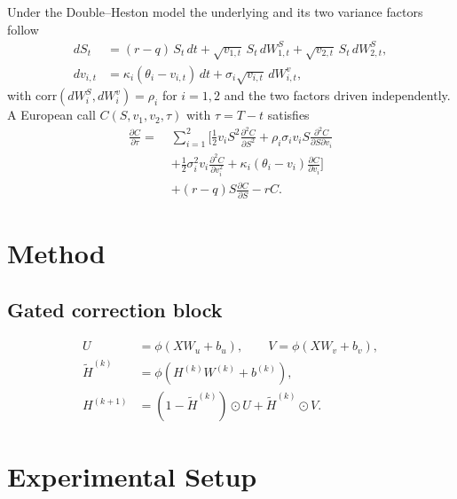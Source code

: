 \documentclass[conference]{IEEEtran}
\begin{document}
Under the Double--Heston model the underlying and its two variance factors
follow
\begin{align}
dS_t &= (r-q)\,S_t\,dt + \sqrt{v_{1,t}}\,S_t\,dW^S_{1,t} + \sqrt{v_{2,t}}\,S_t\,dW^S_{2,t},\\
dv_{i,t} &= \kappa_i(\theta_i - v_{i,t})\,dt + \sigma_i\sqrt{v_{i,t}}\,dW^{v}_{i,t},
\end{align}
with $\mathrm{corr}(dW^S_{i},dW^{v}_{i}) = \rho_i$ for $i=1,2$ and the two
factors driven independently. A European call $C(S,v_1,v_2,\tau)$ with
$\tau = T-t$ satisfies
\begin{equation}
\begin{aligned}
\frac{\partial C}{\partial \tau} =\;&
\sum_{i=1}^{2}\Big[\tfrac{1}{2} v_i S^2 \frac{\partial^2 C}{\partial S^2}
+ \rho_i \sigma_i v_i S \frac{\partial^2 C}{\partial S \partial v_i}\\
&+ \tfrac{1}{2}\sigma_i^2 v_i \frac{\partial^2 C}{\partial v_i^2}
+ \kappa_i(\theta_i - v_i)\frac{\partial C}{\partial v_i}\Big]\\
&+ (r-q) S \frac{\partial C}{\partial S} - r C .
\end{aligned}
\end{equation}

\section{Method}

\subsection{Gated correction block}

\begin{align}
U &= \phi\!\left(X W_u + b_u\right), \qquad V = \phi\!\left(X W_v + b_v\right),\\
\widetilde{H}^{(k)} &= \phi\!\left(H^{(k)} W^{(k)} + b^{(k)}\right),\\
H^{(k+1)} &= \left(1-\widetilde{H}^{(k)}\right)\odot U + \widetilde{H}^{(k)}\odot V .
\end{align}

\section{Experimental Setup}
\end{document}
